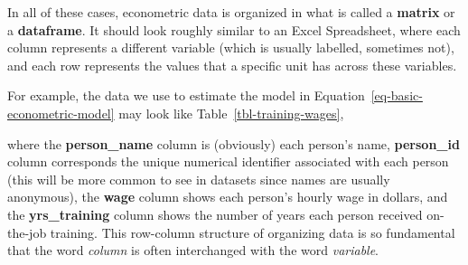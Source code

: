 \documentclass[
  letterpaper,
  DIV=11,
  numbers=noendperiod]{scrreprt}
\begin{document}
In all of these cases, econometric data is organized in what is called a
\textbf{matrix} or a \textbf{dataframe}. It should look roughly similar
to an Excel Spreadsheet, where each column represents a different
variable (which is usually labelled, sometimes not), and each row
represents the values that a specific unit has across these variables.

For example, the data we use to estimate the model in
Equation~\ref{eq-basic-econometric-model} may look like
Table~\ref{tbl-training-wages},

\begin{table}

\caption{\label{tbl-training-wages}Relationship between training and
wages for 10 workers}


\end{table}%

where the \textbf{person\_name} column is (obviously) each person's
name, \textbf{person\_id} column corresponds the unique numerical
identifier associated with each person (this will be more common to see
in datasets since names are usually anonymous), the \textbf{wage} column
shows each person's hourly wage in dollars, and the
\textbf{yrs\_training} column shows the number of years each person
received on-the-job training. This row-column structure of organizing
data is so fundamental that the word \emph{column} is often interchanged
with the word \emph{variable}.
\end{document}
